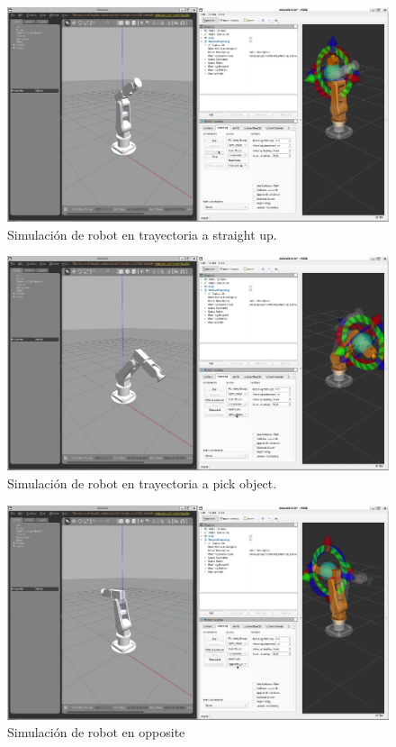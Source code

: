 \begin{figure} [H]
	\centering
	\includegraphics[width=0.9\linewidth]{img/SIMU2}
	\caption{Simulación de robot en trayectoria a straight up.}
	\label{fig:SIMU2}
\end{figure}


\begin{figure} [H]
	\centering
	\includegraphics[width=0.9\linewidth]{img/SIMU6}
	\caption{Simulación de robot en trayectoria a pick object.}
	\label{fig:SIMU6}
\end{figure}


\begin{figure} [H]
	\centering
	\includegraphics[width=0.9\linewidth]{img/SIMU9}
	\caption{Simulación de robot en opposite}
	\label{fig:SIMU9}
\end{figure}

